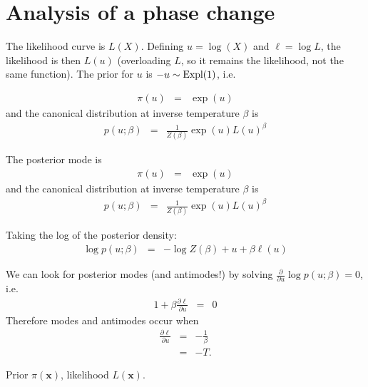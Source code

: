 \documentclass[a4paper, 11pt]{article}
\title{}
\author{}
\newcommand{\xx}{\boldsymbol{x}}	%
\begin{document}
\maketitle



\section{Analysis of a phase change}
The likelihood curve is $L(X)$. Defining $u = \log(X)$ and $\ell = \log L$, the likelihood is
then $L(u)$ (overloading $L$, so it remains the likelihood, not the same
function). The prior for $u$ is $-u \sim \textnormal{Expl}(1)$, i.e.

\begin{eqnarray}
\pi(u) &=& \exp(u)
\end{eqnarray}
and the canonical distribution at inverse temperature $\beta$ is
\begin{eqnarray}
p(u; \beta) &=& \frac{1}{Z(\beta)}\exp(u)L(u)^\beta
\end{eqnarray}

The posterior mode is
\begin{eqnarray}
\pi(u) &=& \exp(u)
\end{eqnarray}
and the canonical distribution at inverse temperature $\beta$ is
\begin{eqnarray}
p(u; \beta) &=& \frac{1}{Z(\beta)}\exp(u)L(u)^\beta
\end{eqnarray}

Taking the log of the posterior density:
\begin{eqnarray}
\log p(u; \beta) &=& -\log Z(\beta) + u + \beta \ell(u)
\end{eqnarray}

We can look for posterior modes (and antimodes!) by solving
$\frac{\partial}{\partial u} \log p(u; \beta) = 0$, i.e.
\begin{eqnarray}
1 + \beta \frac{\partial \ell}{\partial u} &=& 0
\end{eqnarray}
Therefore modes and antimodes occur when
\begin{eqnarray}
\frac{\partial \ell}{\partial u} &=& -\frac{1}{\beta}\\
&=& -T.
\end{eqnarray}


\newpage

Prior $\pi(\xx)$, likelihood $L(\xx)$.
\end{document}
